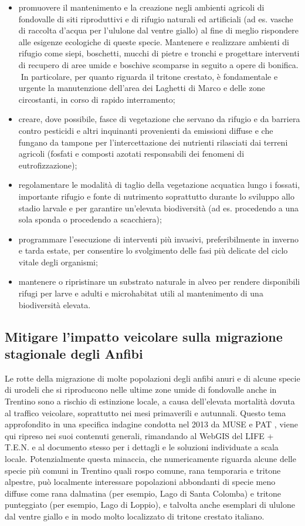 \documentclass[10pt,twoside,openany,x11names,svgnames,italian,a5paper,dvipsnames,table]{memoir}
\begin{document}
\begin{itemize}\itemsep0pt
  \item promuovere il mantenimento e la creazione negli ambienti agricoli di fondovalle di siti riproduttivi e di rifugio naturali ed artificiali (ad es. vasche di raccolta d’acqua per l'ululone dal ventre giallo) al fine di meglio rispondere alle esigenze ecologiche di queste specie. Mantenere e realizzare ambienti di rifugio come siepi, boschetti, mucchi di pietre e tronchi e progettare interventi di recupero di aree umide e boschive scomparse in seguito a opere di bonifica. In particolare, per quanto riguarda il tritone crestato, è fondamentale e urgente la manutenzione dell’area dei Laghetti di Marco e delle zone circostanti, in corso di rapido interramento;
  \item creare, dove possibile, fasce di vegetazione che servano da rifugio e da barriera contro  pesticidi e altri inquinanti provenienti da emissioni diffuse e che fungano da tampone per l’intercettazione dei nutrienti rilasciati dai terreni agricoli (fosfati e composti azotati responsabili dei fenomeni di eutrofizzazione);
  \item regolamentare le modalità di taglio della vegetazione acquatica lungo i fossati, importante rifugio e fonte di nutrimento soprattutto durante lo sviluppo allo stadio larvale e per garantire un’elevata biodiversità (ad es. procedendo a una sola sponda o procedendo a scacchiera); 
  \item programmare l’esecuzione di interventi più invasivi, preferibilmente in inverno e tarda estate, per consentire lo svolgimento delle fasi più delicate del ciclo vitale degli organismi; 
  \item mantenere o ripristinare un substrato naturale in alveo per rendere disponibili rifugi per larve e adulti e microhabitat utili al mantenimento di una biodiversità elevata.
\end{itemize}

\subsection{Mitigare l’impatto veicolare sulla migrazione stagionale degli Anfibi}
Le rotte della migrazione di molte popolazioni degli anfibi anuri e di alcune specie di urodeli che si riproducono nelle ultime zone umide di fondovalle anche in Trentino sono a rischio di estinzione locale, a causa dell’elevata mortalità dovuta al traffico veicolare, soprattutto nei mesi primaverili e autunnali. Questo tema approfondito in una specifica indagine condotta nel 2013 da MUSE e PAT \cite{Romanazzi13}, viene qui ripreso nei suoi contenuti generali, rimandando al WebGIS del LIFE + T.E.N. e al documento stesso per i dettagli e le soluzioni individuate a scala locale.  Potenzialmente questa minaccia, che numericamente riguarda alcune delle specie più comuni in Trentino quali rospo comune, rana temporaria e tritone alpestre, può localmente interessare popolazioni abbondanti di specie meno diffuse come rana dalmatina (per esempio, Lago di Santa Colomba) e tritone punteggiato (per esempio, Lago di Loppio), e talvolta anche esemplari di ululone dal ventre giallo e in modo molto localizzato di tritone  crestato italiano.
\end{document}
